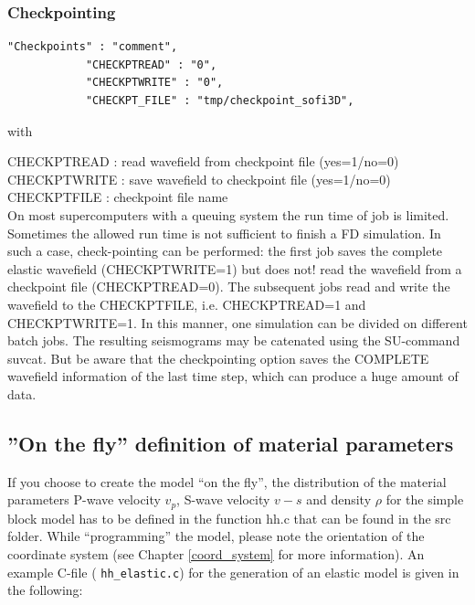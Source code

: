 \documentclass[11pt,onecolumn,oneside]{article}
\begin{document}
\subsubsection{Checkpointing}
\begin{verbatim}
"Checkpoints" : "comment",
			"CHECKPTREAD" : "0",
			"CHECKPTWRITE" : "0",
			"CHECKPT_FILE" : "tmp/checkpoint_sofi3D",
\end{verbatim}

with 

CHECKPTREAD : read wavefield from checkpoint file (yes=1/no=0)\\
CHECKPTWRITE : save wavefield to checkpoint file (yes=1/no=0)\\
CHECKPTFILE : checkpoint file name\\

On most supercomputers with a queuing system the run time of job is limited. Sometimes the allowed run time is not sufficient to finish a FD simulation. In such a case, check-pointing can be performed: the first job saves the complete elastic wavefield (CHECKPTWRITE=1) but does not! read the wavefield from a checkpoint file (CHECKPTREAD=0). The subsequent jobs read and write the wavefield to the CHECKPTFILE, i.e. CHECKPTREAD=1 and CHECKPTWRITE=1. In this manner, one simulation can be divided on different batch jobs. The resulting seismograms may be catenated using the SU-command suvcat. But be aware that the checkpointing option saves the COMPLETE wavefield information of the last time step, which can produce a huge amount of data.

\subsection{''On the fly'' definition of material parameters}
\label{model_def_func}
If you choose to create the model ``on the fly'', the distribution of the material parameters P-wave velocity $v_p$, S-wave velocity $v-s$ and density $\rho$ for the simple block model has to be defined in the function hh.c that can be found in the src folder. While ``programming'' the model, please note the orientation of the coordinate system (see Chapter \ref{coord_system} for more information). An example C-file ( \lstinline{hh_elastic.c}) for the generation of an elastic model is given in the following:


\end{document}
